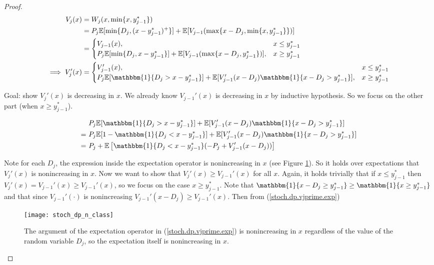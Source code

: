 \begin{proof}
\begin{align}
V_j(x) & = W_j(x, \min\{x, y_{j-1}^* \}) 
\\ & = P_j \E [ \min\{D_j, (x - y_{j-1}^*)^+\} ] + \E[ V_{j-1}( \max\{x - D_j, \min\{x, y_{j-1}^*\} \})]
\\ & = \begin{cases}
V_{j-1}(x), & x \leq y_{j-1}^* \\
P_j \E[ \min\{D_j, x - y_{j-1}^*\}] + \E[ V_{j-1}(\max\{x - D_j, y_{j-1}^*\} ) ] , & x \geq y_{j-1}^*
\end{cases}
\\ \implies V_j'(x) & = \begin{cases}
V_{j-1}'(x), & x \leq y_{j-1}^* \\
P_j \E[  \mathbbm{1} \{D_j > x - y_{j-1}^*\}] + \E[ V_{j-1}'(x- D_j) \mathbbm{1}  \{x - D_j > y_{j-1}^*\} ] , & x \geq y_{j-1}^*
\end{cases}\label{stoch.dp.vjprime}
\end{align}

Goal: show \(V_j'(x)\) is decreasing in \(x\). We already know \(V_{j-1}'(x)\) is decreasing in \(x\) by inductive hypothesis. So we focus on the other part (when \(x \geq y_{j-1}^*\)).

\begin{align}
& P_j \E[  \mathbbm{1} \{D_j > x - y_{j-1}^*\}] + \E[ V_{j-1}'(x- D_j) \mathbbm{1}  \{x - D_j > y_{j-1}^*\} ] \nonumber
\\  = \ &    P_j \E[ 1 -  \mathbbm{1} \{D_j < x - y_{j-1}^*\}] + \E[ V_{j-1}'(x- D_j) \mathbbm{1}  \{x - D_j > y_{j-1}^*\} ] \nonumber
\\ = \ &  P_j +  \E \left[ \mathbbm{1} \{D_j < x - y_{j-1}^*\}  (-P_j + V_{j-1}'(x - D_j))\right] \label{stoch.dp.vjprime.exp}
\end{align}

Note for each \(D_j\), the expression inside the expectation operator is nonincreasing in \(x\) (see Figure \ref{stoch_dp_n_class_fig}). So it holds over expectations that \(V_j'(x)\) is nonincreasing in \(x\). Now we want to show that \(V_j'(x) \geq V_{j-1}'(x)\) for all \(x\). Again, it holds trivially that if \(x \leq y_{j-1}^*\) then \(V_j'(x)  = V_{j-1}'(x) \geq V_{j-1}'(x)\), so we focus on the case \(x \geq y_{j-1}^*\). Note that \(\mathbbm{1} \{x - D_j \geq  y_{j-1}^*\}  \geq  \mathbbm{1}\{x \geq y_{j-1}^*\}\) and that since \(V_{j-1}'(\cdot)\) is nonincreasing \( V_{j-1}'(x - D_j) \geq V_{j-1}'(x)\). Then from (\ref{stoch.dp.vjprime.exp})

\begin{figure}[htbp]
\begin{center}
\texttt{[image: stoch\_dp\_n\_class]}
\caption{The argument of the expectation operator in (\ref{stoch.dp.vjprime.exp}) is nonincreasing in \(x\) regardless of the value of the random variable \(D_j\), so the expectation itself is nonincreasing in \(x\).}
\label{stoch_dp_n_class_fig}
\end{center}
\end{figure}





\end{proof}
